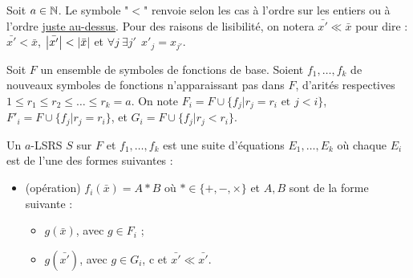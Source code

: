 \documentclass{report}
\begin{document}
		Soit $a \in \mathbb{N}$. Le symbole "$<$" renvoie selon les cas à l'ordre sur les entiers ou à l'ordre \hyperref[def:bon_ordre_sur_uplets]{juste au-dessus}. Pour des raisons de lisibilité, on notera $\bar{x'} \ll \bar{x}$ pour dire :  $\bar{x'} < \bar{x}$, $\left|\bar{x'}\right| < \left|\bar{x}\right|$ et $\forall j \: \exists j' \:\: x'_j = x_{j'}$\footnotemark.
		
		
		\begin{definition}[$a$-LSRS]
			\label{def:aLSRS}
			Soit $F$ un ensemble de symboles de fonctions de base. Soient $f_1, \dots, f_k$ de nouveaux symboles de fonctions n'apparaissant pas dans $F$, d'arités respectives $1 \leqslant r_1 \leqslant r_2 \leqslant \dots \leqslant r_k = a$\footnotemark. 			
			On note $F_i = F \cup \{f_j | r_j = r_i \text{ et } j < i\}$, $F'_i = F \cup \{f_j | r_j = r_i\}$, et $G_i = F \cup \{ f_j | r_j < r_i\}$\footnotemark.
			
				
			Un $a$-LSRS $S$ sur $F$ et $f_1, \dots, f_k$ est une suite d'équations $E_1, \dots, E_k$ où chaque $E_i$ est de l'une des formes suivantes :
			
			\begin{itemize}[itemsep=-1mm]
				\item	(opération) 	$f_i\left(\bar{x}\right) = A * B$ où $* \in \{+,-,\times\}$ et $A, B$ sont de la forme suivante : 
						\begin{itemize}[itemsep=-1mm]
							\item 	$g\left(\bar{x}\right)$, avec $g \in F_i$ ;
							\item 	$g\left(\bar{x'}\right)$, avec $g \in G_i$, c et $\bar{x'} \ll \bar{x'}$.
						\end{itemize}
									

\end{itemize}
\end{definition}
\end{document}
